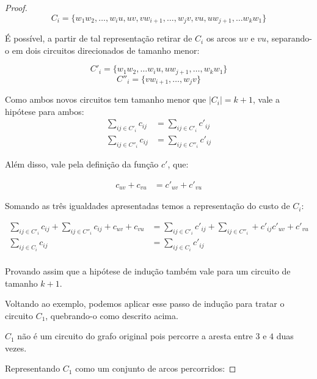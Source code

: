 \begin{proof}
            \[
                C_i = \{ w_1w_2, \dots, w_iu, uv, vw_{i+1}, \dots, w_jv,  vu, uw_{j+1}, \dots w_kw_1\}
            \]

            É possível, a partir de tal representação retirar de $C_i$ os arcos $uv$ e $vu$, separando-o em dois circuitos direcionados de tamanho menor:

            \[
                C'_i = \{w_1w_2, \dots w_iu, uw_{j+1}, \dots, w_kw_1\} 
            \]
            \[
                C''_i = \{vw_{i+1}, \dots, w_jv\}
            \]

            Como ambos novos circuitos tem tamanho menor que $|C_i| = k+1$, vale a hipótese para ambos:
            \begin{align}
                \sum_{ij \in C'_i} c_{ij} &= \sum_{ij \in C'_i} c'_{ij} \\
                \sum_{ij \in C''_i} c_{ij} &= \sum_{ij \in C''_i} c'_{ij}
            \end{align}
            
            Além disso, vale pela definição da função $c'$, que:
            
            \begin{align}
                c_{uv} + c_{vu}  &= c'_{uv} + c'_{vu} 
            \end{align}

            Somando as três igualdades apresentadas temos a representação do custo de $C_i$:

            \begin{align*}
                \sum_{ij \in C'_i} c_{ij} +  \sum_{ij \in C''_i} c_{ij} + c_{uv} + c_{vu}  &= \sum_{ij \in C'_i} c'_{ij} + \sum_{ij \in C''_i} + c'_{ij} c'_{uv} + c'_{vu}  \\
                \sum_{ij \in C_i} c_{ij} &= \sum_{ij \in C_i} c'_{ij} \\
            \end{align*}
             
            Provando assim que a hipótese de indução também vale para um circuito de tamanho $k+1$.

            Voltando ao exemplo, podemos aplicar esse passo de indução para tratar o circuito $C_1$, quebrando-o como descrito acima.

            $C_1$ não é um circuito do grafo original pois percorre a aresta entre $3$ e $4$ duas vezes. 

            Representando $C_1$ como um conjunto de arcos percorridos:


\end{proof}
